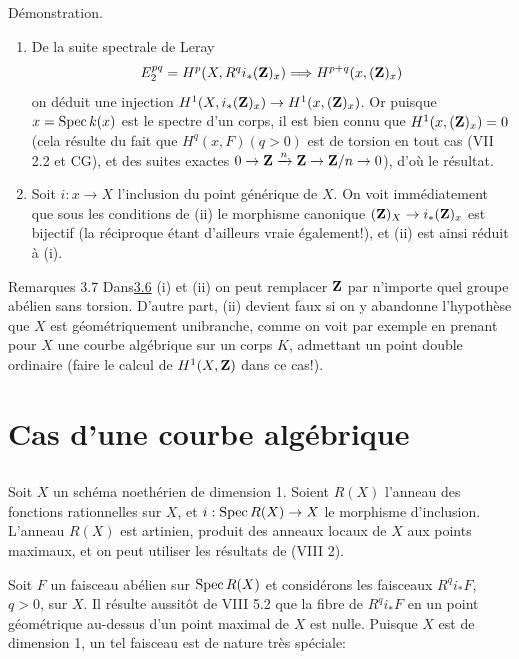 \documentclass[10pt]{../fichiers-configuration-latex/smfart}
\begin{document}
Démonstration.
\begin{enumerate}
\renewcommand{\theenumi}{\roman{enumi}}
\renewcommand{\labelenumi}{(\theenumi)}
\item De la suite spectrale de Leray
$$
E^{pq}_2=H^p(X,R^{q}i_{\ast}(\mathbf{Z})_x)\Longrightarrow
H^{p+q}(x,(\mathbf{Z})_x)
$$
on déduit une injection
$H^1(X,i_{\ast}(\mathbf{Z})_x)\rightarrow
H^1(x,(\mathbf{Z})_x)$. Or puisque $x=\operatorname{Spec} k(x)$ est le
spectre d'un corps, il est bien connu que
$H^1(x,(\mathbf{Z})_{x})=0$ (cela résulte du fait que
$H^q(x,F)(q>0)$ est de torsion en tout cas (\cf VII 2.2 et CG), et des
suites exactes $0\rightarrow
\mathbf{Z}\xrightarrow{n}\mathbf{Z}\rightarrow
\mathbf{Z}/n\rightarrow 0$), d'où le résultat.

\item Soit $i:x\rightarrow X$ l'inclusion du point générique de
$X$. On voit immédiatement que sous les conditions de (ii) le
morphisme canonique $(\mathbf{Z})_X\rightarrow
i_{\ast}(\mathbf{Z})_x$ est bijectif (la réciproque étant
d'ailleurs vraie également!), et (ii) est ainsi réduit à (i).
\end{enumerate}

\begin{enonce*}[remark]{Remarques 3.7}
Dans\pageoriginale \hyperref[IX.prop3.6]{3.6} (i) et (ii) on peut remplacer
$\mathbf{Z}$ par
n'importe quel groupe abélien sans torsion. D'autre part, (ii) devient
faux si on y abandonne l'hypothèse que $X$ est géométriquement
unibranche, comme on voit par exemple en prenant pour $X$ une courbe
algébrique sur un corps $K$, admettant un point double ordinaire
(faire le calcul de $H^1(X,\mathbf{Z})$ dans ce cas!).
\end{enonce*}

\section{Cas d'une courbe algébrique}

\setcounter{subsection}{-1}
\subsection{}
Soit $X$ un schéma noethérien de dimension 1. Soient $R(X)$ l'anneau
des fonctions rationnelles sur $X$, et $i:\operatorname{Spec} R(X)\rightarrow X$ le
morphisme d'inclusion. L'anneau $R(X)$ est artinien, produit des
anneaux locaux de $X$ aux points maximaux, et on peut utiliser les
résultats de (VIII 2).

Soit $F$ un faisceau abélien sur $\operatorname{Spec} R(X)$ et considérons les
faisceaux $R^qi_{\ast}F$, $q>0$, sur $X$. Il résulte aussitôt de VIII
5.2 que la fibre de $R^qi_{\ast}F$ en un point géométrique au-dessus
d'un point maximal de $X$ est nulle. Puisque $X$ est de dimension 1,
un tel faisceau est de nature très spéciale:
\end{document}
